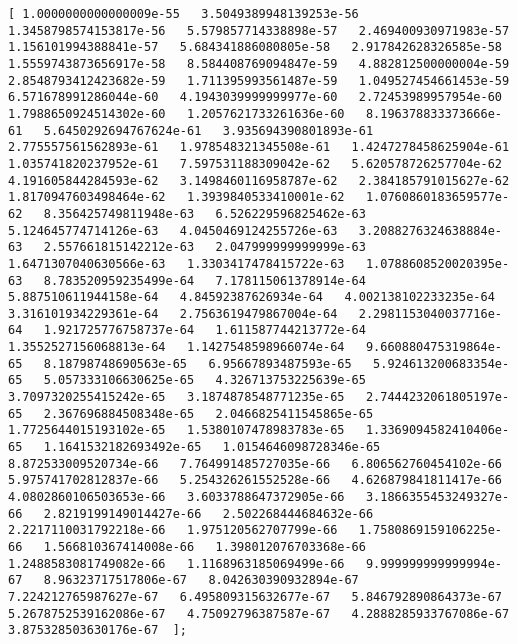 \documentclass[11pt]{article}
\begin{document}
\begin{Verbatim}[commandchars=\\\{\}]
[ 1.0000000000000009e-55   3.5049389948139253e-56   1.3458798574153817e-56   5.579857714338898e-57   2.469400930971983e-57   1.156101994388841e-57   5.684341886080805e-58   2.917842628326585e-58   1.5559743873656917e-58   8.584408769094847e-59   4.882812500000004e-59   2.8548793412423682e-59   1.711395993561487e-59   1.049527454661453e-59   6.571678991286044e-60   4.1943039999999977e-60   2.72453989957954e-60   1.7988650924514302e-60   1.2057621733261636e-60   8.196378833373666e-61   5.6450292694767624e-61   3.935694390801893e-61   2.775557561562893e-61   1.978548321345508e-61   1.4247278458625904e-61   1.035741820237952e-61   7.597531188309042e-62   5.620578726257704e-62   4.191605844284593e-62   3.1498460116958787e-62   2.384185791015627e-62   1.8170947603498464e-62   1.3939840533410001e-62   1.0760860183659577e-62   8.356425749811948e-63   6.526229596825462e-63   5.124645774714126e-63   4.0450469124255726e-63   3.2088276324638884e-63   2.557661815142212e-63   2.047999999999999e-63   1.6471307040630566e-63   1.3303417478415722e-63   1.0788608520020395e-63   8.783520959235499e-64   7.178115061378914e-64   5.887510611944158e-64   4.84592387626934e-64   4.002138102233235e-64   3.316101934229361e-64   2.7563619479867004e-64   2.2981153040037716e-64   1.921725776758737e-64   1.611587744213772e-64   1.3552527156068813e-64   1.1427548598966074e-64   9.660880475319864e-65   8.18798748690563e-65   6.95667893487593e-65   5.924613200683354e-65   5.057333106630625e-65   4.326713753225639e-65   3.7097320255415242e-65   3.1874878548771235e-65   2.7444232061805197e-65   2.367696884508348e-65   2.0466825411545865e-65   1.7725644015193102e-65   1.5380107478983783e-65   1.3369094582410406e-65   1.1641532182693492e-65   1.0154646098728346e-65   8.872533009520734e-66   7.764991485727035e-66   6.806562760454102e-66   5.975741702812837e-66   5.254326261552528e-66   4.626879841811417e-66   4.0802860106503653e-66   3.6033788647372905e-66   3.1866355453249327e-66   2.8219199149014427e-66   2.502268444684632e-66   2.2217110031792218e-66   1.975120562707799e-66   1.7580869159106225e-66   1.566810367414008e-66   1.398012076703368e-66   1.2488583081749082e-66   1.1168963185069499e-66   9.999999999999994e-67   8.96323717517806e-67   8.042630390932894e-67   7.224212765987627e-67   6.495809315632677e-67   5.846792890864373e-67   5.2678752539162086e-67   4.75092796387587e-67   4.2888285933767086e-67   3.875328503630176e-67  ];

\end{Verbatim}
\end{document}

